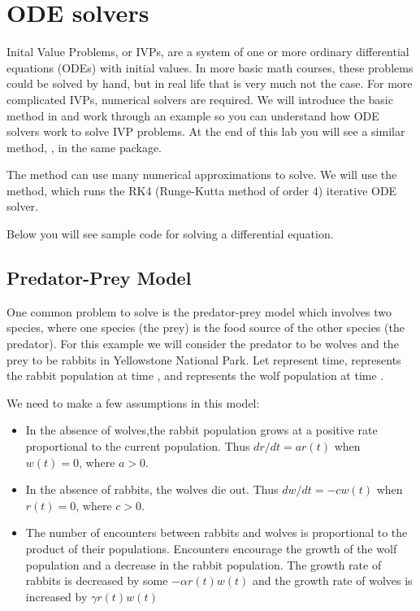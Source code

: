 \label{lab:Weightchange}

\section*{ODE solvers}
Inital Value Problems, or IVPs, are a system of one or more ordinary differential equations (ODEs) with initial values.
In more basic math courses, these problems could be solved by hand, but in real life that is very much not the case.
For more complicated IVPs, numerical solvers are required.
We will introduce the basic  method in  and work through an example so you can understand how ODE solvers work to solve IVP problems.
At the end of this lab you will see a similar method, , in the same package.

The  method can use many numerical approximations to solve.
We will use the  method, which runs the RK4 (Runge-Kutta method of order 4) iterative ODE solver.

Below you will see sample code for solving a differential equation.

\subsection*{Predator-Prey Model}
One common problem to solve is the predator-prey model which involves two species, where one species (the prey) is the food source of the other species (the predator).
For this example we will consider the predator to be wolves and the prey to be rabbits in Yellowstone National Park.
Let  represent time,  represents the rabbit population at time , and  represents the wolf population at time .

We need to make a few assumptions in this model:
\begin{itemize}
\item In the absence of wolves,the rabbit population grows at a positive rate proportional to the current population.
Thus $dr/dt = ar(t)$ when $w(t) = 0$, where $a>0$.
\item In the absence of rabbits, the wolves die out.
Thus $dw/dt = -cw(t)$ when $r(t) = 0$, where $c>0$.
\item The number of encounters between rabbits and wolves is proportional to the product of their populations.
Encounters encourage the growth of the wolf population and a decrease in the rabbit population.
The growth rate of rabbits is decreased by some $-\alpha r(t) w(t)$ and the growth rate of wolves is increased by $\gamma r(t) w(t)$
\end{itemize}

